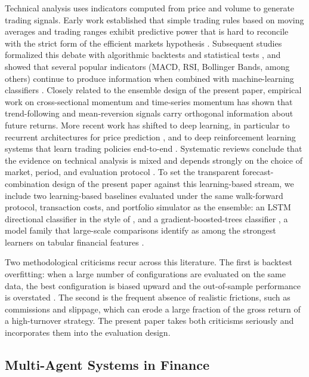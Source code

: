 \documentclass{ieeeaccess}
\begin{document}
Technical analysis uses indicators computed from price and volume to generate trading signals. Early work established that simple trading rules based on moving averages and trading ranges exhibit predictive power that is hard to reconcile with the strict form of the efficient markets hypothesis \cite{brock1992}. Subsequent studies formalized this debate with algorithmic backtests and statistical tests \cite{boboc2013}, and showed that several popular indicators (MACD, RSI, Bollinger Bands, among others) continue to produce information when combined with machine-learning classifiers \cite{gerlein2016}. Closely related to the ensemble design of the present paper, empirical work on cross-sectional momentum \cite{jegadeeshtitman1993,asness2013} and time-series momentum \cite{moskowitz2012} has shown that trend-following and mean-reversion signals carry orthogonal information about future returns. More recent work has shifted to deep learning, in particular to recurrent architectures for price prediction \cite{fischerkrauss2018}, and to deep reinforcement learning systems that learn trading policies end-to-end \cite{huang2022,shavandi2022,hambly2023,anders2024empirical}. Systematic reviews conclude that the evidence on technical analysis is mixed and depends strongly on the choice of market, period, and evaluation protocol \cite{nti2020,kruczkowski2026review}. To set the transparent forecast-combination design of the present paper against this learning-based stream, we include two learning-based baselines evaluated under the same walk-forward protocol, transaction costs, and portfolio simulator as the ensemble: an LSTM directional classifier in the style of \cite{fischerkrauss2018}, and a gradient-boosted-trees classifier \cite{friedman2001,ke2017lightgbm}, a model family that large-scale comparisons identify as among the strongest learners on tabular financial features \cite{krauss2017,gukellyxiu2020}.

Two methodological criticisms recur across this literature. The first is backtest overfitting: when a large number of configurations are evaluated on the same data, the best configuration is biased upward and the out-of-sample performance is overstated \cite{bailey2014,harvey2016}. The second is the frequent absence of realistic frictions, such as commissions and slippage, which can erode a large fraction of the gross return of a high-turnover strategy. The present paper takes both criticisms seriously and incorporates them into the evaluation design.

\subsection{Multi-Agent Systems in Finance}
\end{document}
